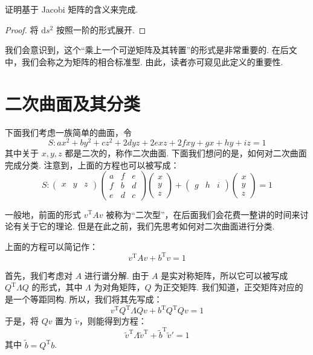 证明基于 Jacobi 矩阵的含义来完成.

\begin{proof}
    将 $\mathrm{d} s^2$ 按照一阶的形式展开.
\end{proof}

我们会意识到，这个``乘上一个可逆矩阵及其转置''的形式是非常重要的. 在后文中，我们会称之为矩阵的相合标准型. 由此，读者亦可窥见此定义的重要性.

\section{二次曲面及其分类}

下面我们考虑一族简单的曲面，令
\[
S: a x^2 + b y^2 + c z^2 + 2 d y z + 2 e x z + 2 f x y + g x + h y + i z = 1
\]
其中关于 $x, y, z$ 都是二次的，称作二次曲面. 下面我们想问的是，如何对二次曲面完成分类. 注意到，上面的方程也可以被写成：
\[
S: \begin{pmatrix}
    x & y & z
\end{pmatrix}
\begin{pmatrix}
    a & f & e \\
    f & b & d \\
    e & d & c
\end{pmatrix}
\begin{pmatrix}
    x \\ y \\ z
\end{pmatrix} + \begin{pmatrix}
    g & h & i
\end{pmatrix} \begin{pmatrix}
    x \\ y \\ z
\end{pmatrix} = 1
\]

一般地，前面的形式 $v^\mathrm{T} A v$ 被称为``二次型''，在后面我们会花费一整讲的时间来讨论有关于它的理论. 但是在此之前，我们先思考如何对二次曲面进行分类.

上面的方程可以简记作：
\[
v^\mathrm{T} A v + b^\mathrm{T} v = 1
\]

首先，我们考虑对 $A$ 进行谱分解. 由于 $A$ 是实对称矩阵，所以它可以被写成 $Q^\mathrm{T} \Lambda Q$ 的形式，其中 $\Lambda$ 为对角矩阵，$Q$ 为正交矩阵. 我们知道，正交矩阵对应的是一个等距同构. 所以，我们将其先写成：
\[
v^\mathrm{T} Q^\mathrm{T} \Lambda Q v + b^\mathrm{T} Q^\mathrm{T} Q v = 1
\]
于是，将 $Q v$ 置为 $\tilde v$，则能得到方程：
\[
\tilde v^\mathrm{T} \Lambda \tilde v^\mathrm{T} + \tilde b^\mathrm{T} \tilde v' = 1
\]
其中 $\tilde b = Q^\mathrm{T} b$.

